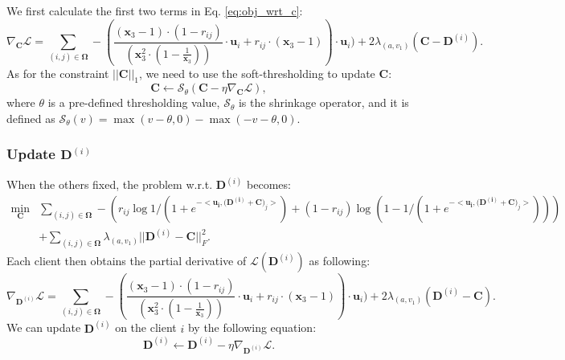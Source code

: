 \documentclass{article} %
\begin{document}
We first calculate the first two terms in Eq. \eqref{eq:obj_wrt_c}:
\begin{equation}
    \nabla_{\mathbf{C}} \mathcal{L} = 
    \sum_{(i, j) \in \mathbf{\Omega}}
    -(\frac{(\mathbf{x}_3-1) \cdot (1-r_{ij})}{(\mathbf{x}_3^{2} \cdot(1-\frac{1}{\mathbf{x}_3}))} \cdot \mathbf{u}_i + r_{ij} \cdot (\mathbf{x}_3-1)) \cdot \mathbf{u}_i)
    +2\lambda_{(a, v_1)}(\mathbf{C}-\mathbf{D}^{(i)}).
    \label{eq:grad_c}
\end{equation}
As for the constraint $||\mathbf{C}||_1$, we need to use the soft-thresholding \citep{donoho1995noising} to update $\mathbf{C}$:
\begin{equation}
    \mathbf{C} \leftarrow \mathcal{S}_{\theta}(\mathbf{C} - \eta \nabla_{\mathbf{C}} \mathcal{L}),
\end{equation}
where $\theta$ is a pre-defined thresholding value, $\mathcal{S}_{\theta}$ is the shrinkage operator, and it is defined as $\mathcal{S}_{\theta} (v) = \max (v - \theta, 0) - \max (- v - \theta, 0)$.

\subsubsection{Update $\mathbf{D}^{(i)}$}

When the others fixed, the problem w.r.t. $\mathbf{D}^{(i)}$ becomes:
\begin{equation}
    \begin{aligned}
    \min_{\mathbf{C}} 
        & \sum_{(i, j) \in \mathbf{\Omega}} - (
            r_{ij}\log 1/(1+e^{-<\mathbf{\mathbf{u}_i, (\mathbf{D}^{(i)} + \mathbf{C}})_j>}) + 
            (1-r_{ij})  \log (1-1/(1+e^{-<\mathbf{\mathbf{u}_i, (\mathbf{D}^{(i)} + \mathbf{C}})_j>}))
        ) \\
        & +\sum_{(i, j) \in \mathbf{\Omega}} \lambda_{(a, v_1)} ||\mathbf{D}^{(i)} - \mathbf{C}||^2_F.
    \end{aligned}
    \label{eq:obj_wrt_d}
\end{equation}
Each client then obtains the partial derivative of $\mathcal{L}(\mathbf{D}^{(i)})$ as following:
\begin{equation}
    \nabla_{\mathbf{D}^{(i)}} \mathcal{L} = 
    \sum_{(i, j) \in \mathbf{\Omega}}
    -(\frac{(\mathbf{x}_3-1) \cdot (1-r_{ij})}{(\mathbf{x}_3^{2} \cdot(1-\frac{1}{\mathbf{x}_3}))} \cdot \mathbf{u}_i + r_{ij} \cdot (\mathbf{x}_3-1)) \cdot \mathbf{u}_i)
    +2\lambda_{(a, v_1)}(\mathbf{D}^{(i)} - \mathbf{C}).
    \label{eq:grad_d}
\end{equation}
We can update $\mathbf{D}^{(i)}$ on the client $i$ by the following equation:
\begin{equation}
    \mathbf{D}^{(i)} \leftarrow \mathbf{D}^{(i)} - \eta \nabla_{\mathbf{D}^{(i)}} \mathcal{L}.
\end{equation}
\end{document}
